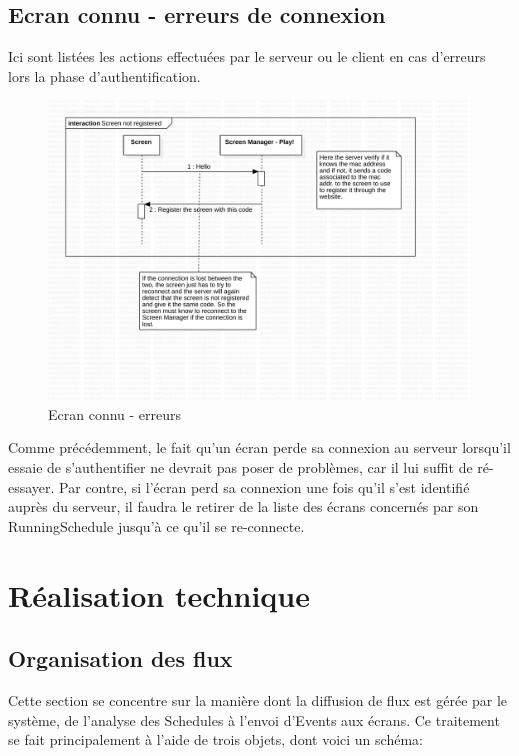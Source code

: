 \documentclass[french]{article}
\begin{document}
\subsection{Ecran connu - erreurs de connexion}
	Ici sont listées les actions effectuées par le serveur ou le client en cas d'erreurs lors la phase d'authentification.
	\begin{figure}[h!]
		\centering
		\includegraphics[page={2}, scale=0.5]{protocol_v2}
		\caption{Ecran connu - erreurs}
	\end{figure}
	
			
	Comme précédemment, le fait qu'un écran perde sa connexion au serveur lorsqu'il essaie de s'authentifier ne devrait pas poser de problèmes, car il lui suffit de ré-essayer. \newline
	Par contre, si l'écran perd sa connexion une fois qu'il s'est identifié auprès du serveur, il faudra le retirer de la liste des écrans concernés par son RunningSchedule jusqu'à ce qu'il se re-connecte. \newpage
	
	
\section{Réalisation technique}

\subsection{Organisation des flux}

Cette section se concentre sur la manière dont la diffusion de flux est gérée par le système, de l'analyse des Schedules à l'envoi d'Events aux écrans. Ce traitement se fait principalement à l'aide de trois objets, dont voici un schéma: 
\end{document}
